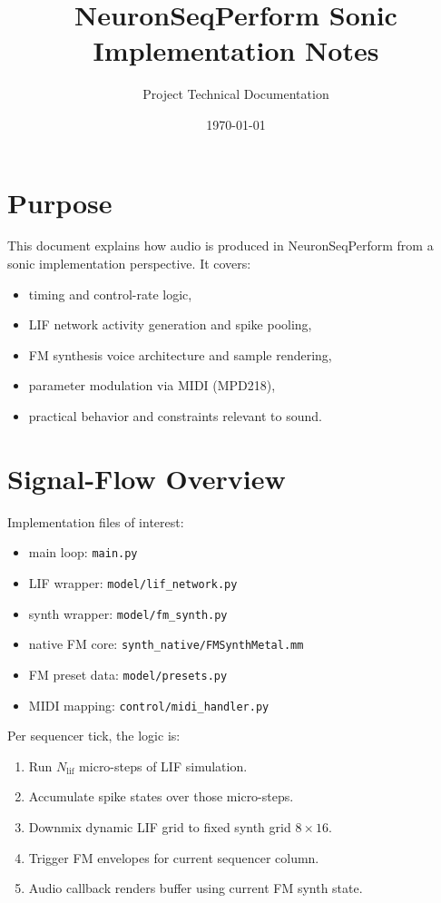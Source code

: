 \documentclass[11pt,a4paper]{article}
\title{NeuronSeqPerform Sonic Implementation Notes}
\author{Project Technical Documentation}
\date{\today}
\begin{document}
\maketitle

\section{Purpose}
This document explains how audio is produced in NeuronSeqPerform from a sonic implementation perspective. It covers:
\begin{itemize}
    \item timing and control-rate logic,
    \item LIF network activity generation and spike pooling,
    \item FM synthesis voice architecture and sample rendering,
    \item parameter modulation via MIDI (MPD218),
    \item practical behavior and constraints relevant to sound.
\end{itemize}

\section{Signal-Flow Overview}
Implementation files of interest:
\begin{itemize}
    \item main loop: \texttt{main.py}
    \item LIF wrapper: \texttt{model/lif\_network.py}
    \item synth wrapper: \texttt{model/fm\_synth.py}
    \item native FM core: \texttt{synth\_native/FMSynthMetal.mm}
    \item FM preset data: \texttt{model/presets.py}
    \item MIDI mapping: \texttt{control/midi\_handler.py}
\end{itemize}

Per sequencer tick, the logic is:
\begin{enumerate}
    \item Run $N_{\mathrm{lif}}$ micro-steps of LIF simulation.
    \item Accumulate spike states over those micro-steps.
    \item Downmix dynamic LIF grid to fixed synth grid $8 \times 16$.
    \item Trigger FM envelopes for current sequencer column.
    \item Audio callback renders buffer using current FM synth state.
\end{enumerate}
\end{document}

